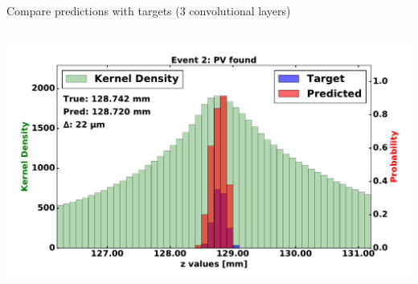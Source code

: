 \begin{frame}{Compare predictions with targets (3 convolutional layers)}
\begin{columns}[c]
\begin{center}
           \includegraphics[width=1\textwidth, height=0.45\textwidth, trim=18 0 18 0]{images/120000_3layer_15.pdf}
       \end{center}
  \end{columns}
\end{frame}





